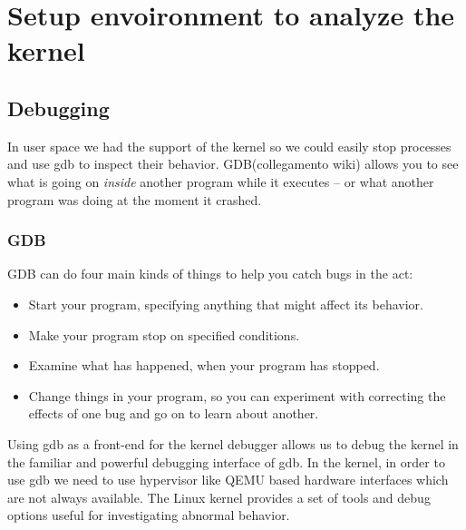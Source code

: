 \documentclass{masterthesis}
\begin{document}
\chapter{Setup envoironment to analyze the kernel}
\label{ch:analyze}

\section{Debugging}
\label{sect:debugging}

In user space we had the support of the kernel so we could easily stop processes and use gdb to inspect their behavior.
GDB(collegamento wiki) allows you to see what is going on \emph{inside} another program while it executes -- or what another program was doing at the moment it crashed.
\subsection{GDB}
\label{subsect:gdb}
GDB can do four main kinds of things to help you catch bugs in the act:
\begin{itemize}
\item Start your program, specifying anything that might affect its behavior.
\item Make your program stop on specified conditions.
\item Examine what has happened, when your program has stopped.
\item Change things in your program, so you can experiment with correcting the effects of one bug and go on to learn about another.
\end{itemize}
Using gdb as a front-end for the kernel debugger allows us to debug the kernel in the familiar and powerful debugging interface of gdb.
In the kernel, in order to use gdb we need to use hypervisor like QEMU based hardware interfaces which are not always available.
The Linux kernel provides a set of tools and debug options useful for investigating abnormal behavior.
\end{document}
